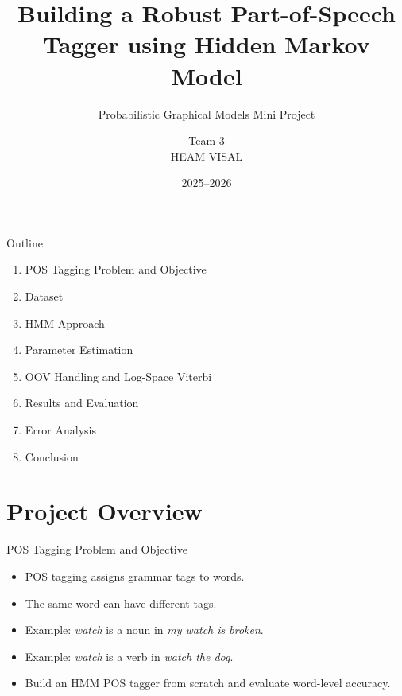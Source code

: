 \documentclass[aspectratio=169]{beamer}
\title[HMM POS Tagger]{Building a Robust Part-of-Speech Tagger using Hidden Markov Model}
\subtitle{Probabilistic Graphical Models Mini Project}
\author[Team 3]{Team 3\\HEAM VISAL}
\institute[ITC]{Institute of Technology of Cambodia\\Department of Applied Mathematics and Statistics}
\date{2025--2026}
\begin{document}
\begin{frame}
  \titlepage
\end{frame}

\begin{frame}{Outline}
  \begin{enumerate}
    \item POS Tagging Problem and Objective
    \item Dataset
    \item HMM Approach
    \item Parameter Estimation
    \item OOV Handling and Log-Space Viterbi
    \item Results and Evaluation
    \item Error Analysis
    \item Conclusion
  \end{enumerate}
\end{frame}

\section{Project Overview}

\begin{frame}{POS Tagging Problem and Objective}
  \begin{itemize}
    \item POS tagging assigns grammar tags to words.
    \item The same word can have different tags.
    \item Example: \emph{watch} is a noun in \emph{my watch is broken}.
    \item Example: \emph{watch} is a verb in \emph{watch the dog}.
    \item Build an HMM POS tagger from scratch and evaluate word-level accuracy.
  \end{itemize}
\end{frame}
\end{document}
